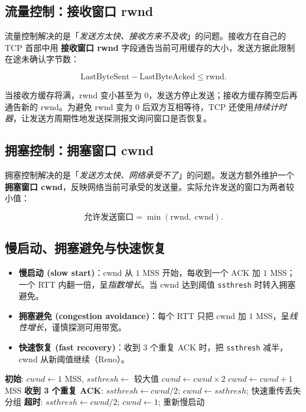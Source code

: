 \subsection{流量控制：接收窗口 rwnd}

流量控制解决的是「\emph{发送方太快、接收方来不及收}」的问题。接收方在自己的 TCP 首部中用 \textbf{接收窗口 rwnd} 字段通告当前可用缓存的大小，发送方据此限制在途未确认字节数：

\begin{equation}
    \text{LastByteSent} - \text{LastByteAcked} \le \text{rwnd}.
    \label{eq:flow}
\end{equation}

当接收方缓存将满，rwnd 变小甚至为 $0$，发送方停止发送；接收方缓存腾空后再通告新的 rwnd。为避免 rwnd 变为 $0$ 后双方互相等待，TCP 还使用\emph{持续计时器}，让发送方周期性地发送探测报文询问窗口是否恢复。

\subsection{拥塞控制：拥塞窗口 cwnd}

拥塞控制解决的是「\emph{发送方太快、网络承受不了}」的问题。发送方额外维护一个 \textbf{拥塞窗口 cwnd}，反映网络当前可承受的发送量。实际允许发送的窗口为两者较小值：

\begin{equation}
    \text{允许发送窗口} = \min(\text{rwnd},\; \text{cwnd}).
    \label{eq:min_window}
\end{equation}

\subsection{慢启动、拥塞避免与快速恢复}

\begin{itemize}
    \item \textbf{慢启动 (slow start)}：cwnd 从 $1$ MSS 开始，每收到一个 ACK 加 $1$ MSS；一个 RTT 内翻一倍，呈\emph{指数增长}。当 cwnd 达到阈值 \texttt{ssthresh} 时转入拥塞避免。
    \item \textbf{拥塞避免 (congestion avoidance)}：每个 RTT 只把 cwnd 加 $1$ MSS，呈\emph{线性增长}，谨慎探测可用带宽。
    \item \textbf{快速恢复 (fast recovery)}：收到 $3$ 个重复 ACK 时，把 \texttt{ssthresh} 减半，cwnd 从新阈值继续（Reno）。
\end{itemize}

\begin{algorithm}[H]
\caption{TCP 拥塞控制（Reno）事件处理}
\begin{algorithmic}[1]
\State \textbf{初始}: $cwnd\gets1$ MSS, $ssthresh\gets$ 较大值
     
        \State $cwnd \gets cwnd \times 2$
    \Else {}
        \State $cwnd \gets cwnd + 1$ MSS
    \EndIf
\EndFor
\State \textbf{收到 3 个重复 ACK}: $ssthresh\gets cwnd/2$;\; $cwnd\gets ssthresh$;\; 快速重传丢失分组 
\State \textbf{超时}: $ssthresh\gets cwnd/2$;\; $cwnd\gets1$;\; 重新慢启动 
\end{algorithmic}
\end{algorithm}


